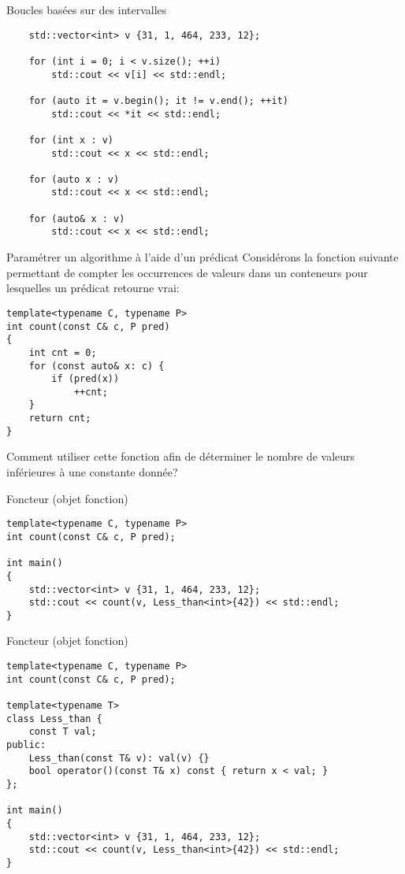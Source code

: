 \documentclass[handout]{beamer}
\begin{document}
\begin{frame}[fragile]{Boucles basées sur des intervalles}
    \begin{lstlisting}
    std::vector<int> v {31, 1, 464, 233, 12};

    for (int i = 0; i < v.size(); ++i)
        std::cout << v[i] << std::endl;

    for (auto it = v.begin(); it != v.end(); ++it)
        std::cout << *it << std::endl;

    for (int x : v)
        std::cout << x << std::endl;

    for (auto x : v)
        std::cout << x << std::endl;

    for (auto& x : v)
        std::cout << x << std::endl;

    \end{lstlisting}
\end{frame}

\begin{frame}[fragile]{Paramétrer un algorithme à l'aide d'un prédicat}
    Considérons la fonction suivante permettant de compter les occurrences de valeurs dans un
    conteneurs pour lesquelles un prédicat retourne vrai:

    \begin{lstlisting}
template<typename C, typename P>
int count(const C& c, P pred)
{
    int cnt = 0;
    for (const auto& x: c) {
        if (pred(x))
            ++cnt;
    }
    return cnt;
}
    \end{lstlisting}

    Comment utiliser cette fonction afin de déterminer le nombre de valeurs inférieures à une
    constante donnée?
\end{frame}

\begin{frame}[fragile]{Foncteur (objet fonction)}
    \begin{lstlisting}
template<typename C, typename P>
int count(const C& c, P pred);

int main()
{
    std::vector<int> v {31, 1, 464, 233, 12};
    std::cout << count(v, Less_than<int>{42}) << std::endl;
}
    \end{lstlisting}
\end{frame}

\begin{frame}[fragile]{Foncteur (objet fonction)}
    \begin{lstlisting}
template<typename C, typename P>
int count(const C& c, P pred);

template<typename T>
class Less_than {
    const T val;
public:
    Less_than(const T& v): val(v) {}
    bool operator()(const T& x) const { return x < val; }
};

int main()
{
    std::vector<int> v {31, 1, 464, 233, 12};
    std::cout << count(v, Less_than<int>{42}) << std::endl;
}
    \end{lstlisting}
\end{frame}
\end{document}
